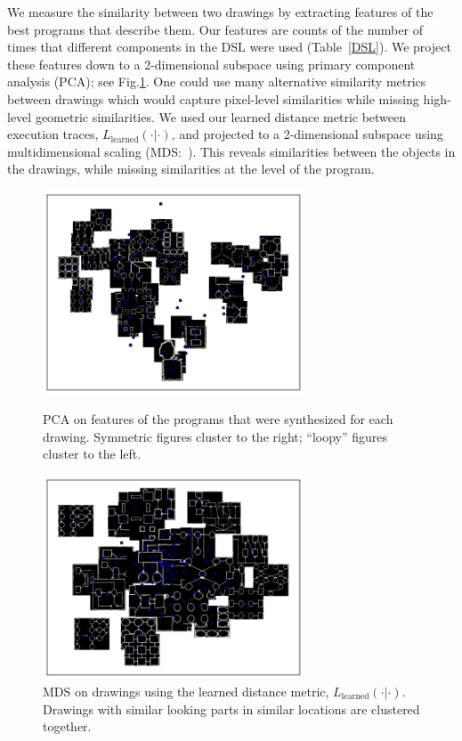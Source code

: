 \documentclass{article}
\begin{document}
We measure the similarity between two drawings by extracting features
of the best programs that describe them. Our features are counts of the number of times that different components in the
DSL were used (Table~\ref{DSL}).  We project these features down to a
2-dimensional subspace using primary component analysis
(PCA); see Fig.\ref{NMF}.  One could use many
alternative similarity metrics between drawings which would capture pixel-level similarities while missing high-level geometric similarities.
We used our learned distance metric between execution traces, $L_{\text{learned}}(\cdot|\cdot)$, and projected to a 2-dimensional subspace using multidimensional scaling (MDS:~\cite{cox2008multidimensional}). This reveals similarities between the objects in the drawings,
while missing similarities at the level of the program.
\begin{figure}[h]
\centering  \begin{minipage}{\textwidth}\centering
    \includegraphics[width = 0.69\textwidth]{figures/PCA.png}
    \caption{PCA on features of the programs that were synthesized for each drawing. Symmetric figures cluster to the right; ``loopy'' figures cluster to the left.}    \label{NMF}
  \end{minipage} %
  \begin{minipage}{\textwidth}\centering
    \includegraphics[width = 0.69\textwidth]{figures/imageSimilarity.png} 
    \caption{MDS on drawings using the learned distance metric, $L_{\text{learned}}(\cdot|\cdot)$. Drawings with similar looking parts in similar locations are clustered together.}
  \end{minipage}
\end{figure}
\end{document}
